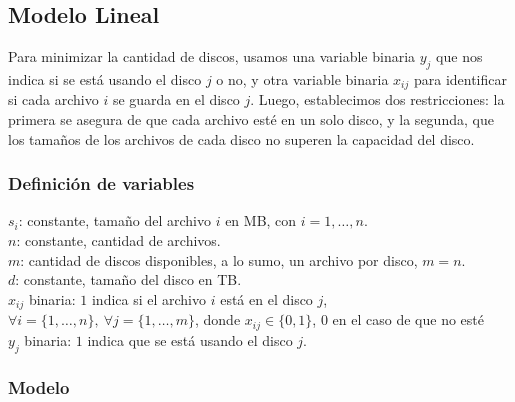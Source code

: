 \documentclass[11pt, a4paper, pdftex]{article}
\begin{document}
\subsection{Modelo Lineal}\label{modelo:primera:parte}

Para minimizar la cantidad de discos, usamos una variable binaria
$y_{j}$ que nos indica si se está usando el disco $j$ o no, y otra
variable binaria $x_{ij}$ para identificar si cada archivo $i$ se guarda
en el disco $j$. Luego, establecimos dos restricciones: la primera se
asegura de que cada archivo esté en un solo disco, y la segunda, que los
tamaños de los archivos de cada disco no superen la capacidad del disco.

\newpage
\subsubsection{Definición de variables}


\noindent $s_{i}$: constante, tamaño del archivo $i$ en MB, con $i = 1, \ldots, n$. \\

\noindent $n$: constante, cantidad de archivos. \\

\noindent $m$: cantidad de discos disponibles, a lo sumo, un archivo por disco, $m = n$. \\


\noindent $d$: constante, tamaño del disco en TB. \\ 

\noindent $x_{ij}$ binaria: $1$ indica si el archivo $i$ está en el disco $j$, $\forall i = \{1, \ldots, n\},\ \forall j = \{1, \ldots, m\}$, donde $x_{ij} \in \{0, 1\}$, $0$ en el caso de que no esté\\

\noindent $y_{j}$ binaria: $1$ indica que se está usando el disco $j$.

\subsubsection{Modelo}
\end{document}
